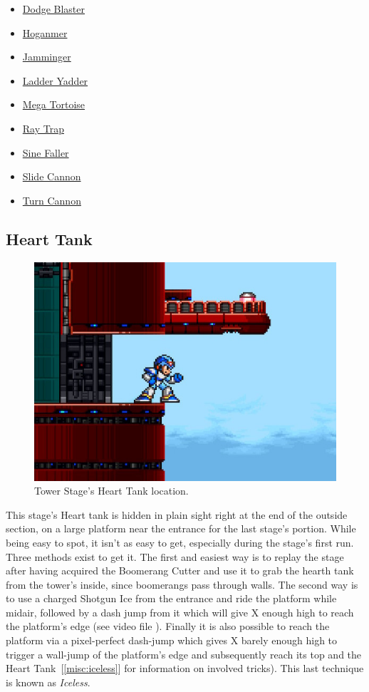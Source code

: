 \begin{itemize}
	\item \hyperlink{enem:Dodge_Blaster}{Dodge Blaster}
	\item \hyperlink{enem:Hoganmer}{Hoganmer}
	\item \hyperlink{enem:Jamminger}{Jamminger}
	\item \hyperlink{enem:Ladder_Yadder}{Ladder Yadder}
	\item \hyperlink{enem:Mega_Tortoise}{Mega Tortoise}
	\item \hyperlink {enem:Ray_Trap}{Ray Trap}
	\item \hyperlink{enem:Sine_Faller}{Sine Faller}
	\item \hyperlink{enem:Slide_Cannon}{Slide Cannon}
	\item \hyperlink{enem:Turn_Cannon}{Turn Cannon}
\end{itemize}

\subsection{Heart Tank}
\begin{figure}[htp]
	\centering
	\includegraphics[width=0.4\linewidth]{figures/X1/Boomer_kuwanger/Tower_heart.jpg}
	\caption{Tower Stage's Heart Tank location.}
\end{figure}

This stage's Heart tank is hidden in plain sight right at the end of the outside section, on a large platform near the entrance for the last stage's portion. While being easy to spot, it isn't as easy to get, especially during the stage's first run. Three methods exist to get it. The first and easiest way is to replay the stage after having acquired the Boomerang Cutter and use it to grab the hearth tank from the tower's inside, since boomerangs pass through walls. The second way is to use a charged Shotgun Ice from the entrance and ride the platform while midair, followed by  a dash jump from it which will give X enough high to reach the platform's edge (see video file ). Finally it is also possible to reach the platform via a pixel-perfect dash-jump which gives X barely enough high to trigger a wall-jump of the platform's edge and subsequently reach its top and the Heart Tank~[\ref{misc:iceless}] for information on involved tricks). This last technique is known as \textit{Iceless}. 

